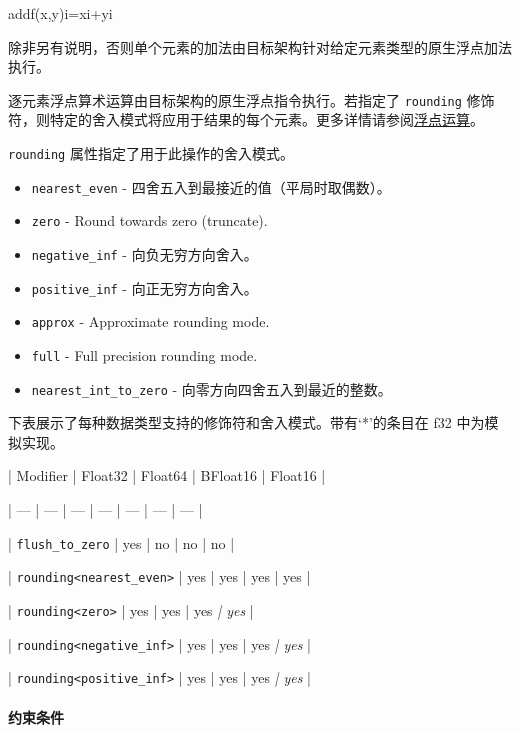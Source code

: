 \documentclass{article}
\begin{document}
addf(x,y)i=xi+yi


除非另有说明，否则单个元素的加法由目标架构针对给定元素类型的原生浮点加法执行。



逐元素浮点算术运算由目标架构的原生浮点指令执行。若指定了 \texttt{rounding} 修饰符，则特定的舍入模式将应用于结果的每个元素。更多详情请参阅\href{https://docs.nvidia.com/cuda/tile-ir/latest/sections/operations.html#op-group-floating-point}{浮点运算}。



\texttt{rounding} 属性指定了用于此操作的舍入模式。



\begin{itemize}
\item \texttt{nearest\_even} - 四舍五入到最接近的值（平局时取偶数）。
\item \texttt{zero} - Round towards zero (truncate).

\item \texttt{negative\_inf} - 向负无穷方向舍入。
\item \texttt{positive\_inf} - 向正无穷方向舍入。
\item \texttt{approx} - Approximate rounding mode.

\item \texttt{full} - Full precision rounding mode.

\item \texttt{nearest\_int\_to\_zero} - 向零方向四舍五入到最近的整数。


\end{itemize}
下表展示了每种数据类型支持的修饰符和舍入模式。带有`*'的条目在 f32 中为模拟实现。



| Modifier | Float32 | Float64 | BFloat16 | Float16 |


| --- | --- | --- | --- | --- | --- | --- |


| \texttt{flush\_to\_zero} | yes | no | no | no |


| \texttt{rounding<nearest\_even>} | yes | yes | yes | yes |


| \texttt{rounding<zero>} | yes | yes | yes\textit{ | yes} |


| \texttt{rounding<negative\_inf>} | yes | yes | yes\textit{ | yes} |


| \texttt{rounding<positive\_inf>} | yes | yes | yes\textit{ | yes} |






\paragraph{约束条件}
\end{document}
